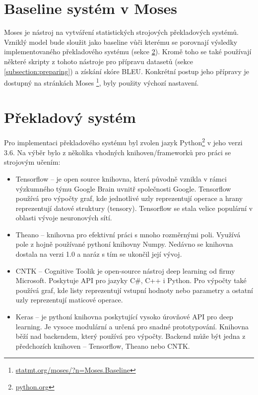 \section{Baseline systém v Moses}\label{section:baseline}
Moses \cite{moses} je nástroj na vytváření statistických strojových překladových systémů. Vzniklý model bude sloužit jako baseline vůči kterému se porovnají výsledky implementovaného překladového systému (sekce \ref{section:nmtSystem}). Kromě toho se také používají některé skripty z tohoto nástroje pro přípravu datasetů (sekce \ref{subsection:preparing}) a získání skóre BLEU. Konkrétní postup jeho přípravy je dostupný na stránkách Moses \footnote{\url{statmt.org/moses/?n=Moses.Baseline}}, byly použity výchozí nastavení.

\section{Překladový systém}\label{section:nmtSystem}
Pro implementaci překladového systému byl zvolen jazyk Python\footnote{\url{python.org}} v jeho verzi 3.6. Na výběr bylo z několika vhodných knihoven/frameworků pro práci se strojovým učením:

\begin{itemize}
  \item Tensorflow -- je open source knihovna, která původně vznikla v rámci výzkumného týmu Google Brain uvnitř společnosti Google. Tensorflow používá pro výpočty graf, kde jednotlivé uzly reprezentují operace a hrany reprezentují datové struktury (tensory). Tensorflow se stala velice populární v oblasti vývoje neuronových sítí.
  \item Theano -- knihovna pro efektivní práci s mnoho rozměrnými poli. Využívá pole z hojně používané pythoní knihovny Numpy. Nedávno se knihovna dostala na verzi 1.0 a naráz s tím se ukončil její vývoj.
  \item CNTK -- Cognitive Toolik je open-source nástroj deep learning od firmy Microsoft. Poskytuje API pro jazyky C\#, C++ i Python. Pro výpočty také používá graf, kde listy reprezentují vstupní hodnoty nebo parametry a ostatní uzly reprezentují maticové operace.
  \item Keras -- je pythoní knihovna poskytující vysoko úrovňové API pro deep learning. Je vysoce modulární a určená pro snadné prototypování. Knihovna běží nad backendem, který používá pro výpočty. Backend může být jedna z předchozích knihoven -- Tensorflow, Theano nebo CNTK.
\end{itemize}



